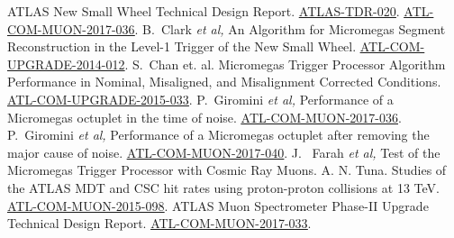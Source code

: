 \begin{thebibliography}{99}
\label{bibliography}
\setlength{\itemsep}{1.5pt plus 2.0pt minus 1.4pt}
\setlength{\parsep}{0pt}
\setlength{\parskip}{0pt}
\vspace{-6pt}
 ATLAS New Small Wheel Technical Design Report. \href{http://cds.cern.ch/record/1552862}{\color{blue}\underline{ATLAS-TDR-020}}.
 \href{https://cds.cern.ch/record/2272355}{\color{blue}\underline{ATL-COM-MUON-2017-036}}.
 B.~Clark {\it et al,} An Algorithm for Micromegas Segment
 Reconstruction in the Level-1 Trigger of the New Small Wheel. 
\href{https://cds.cern.ch/record/1706160}{\color{blue}\underline{ATL-COM-UPGRADE-2014-012}}.
 S.~Chan et. al. Micromegas Trigger Processor Algorithm Performance in Nominal, Misaligned, and Misalignment
 Corrected Conditions. \href{https://cds.cern.ch/record/2113121}{\color{blue}\underline{ATL-COM-UPGRADE-2015-033}}.
 P.~Giromini {\it et al,} Performance of a Micromegas octuplet in the time  of noise.
 \href{https://cds.cern.ch/record/2277316}{\color{blue}\underline{ATL-COM-MUON-2017-036}}.
 P.~Giromini  {\it et al,} Performance of a Micromegas octuplet after removing the major cause of noise.
 \href{https://cds.cern.ch/record/2277316}{\color{blue}\underline{ATL-COM-MUON-2017-040}}.
 J. ~Farah {\it et al,} Test of the Micromegas Trigger Processor with Cosmic Ray Muons.
 A. N. Tuna. Studies of the ATLAS MDT and CSC hit rates using proton-proton collisions at 13 TeV. 
  \href{https://cds.cern.ch/record/2111365}{\color{blue}\underline{ATL-COM-MUON-2015-098}}.
 ATLAS Muon Spectrometer Phase-II Upgrade Technical Design Report.
 \href{https://cds.cern.ch/record/2270169/}{\color{blue}\underline{ATL-COM-MUON-2017-033}}.

\end{thebibliography}








